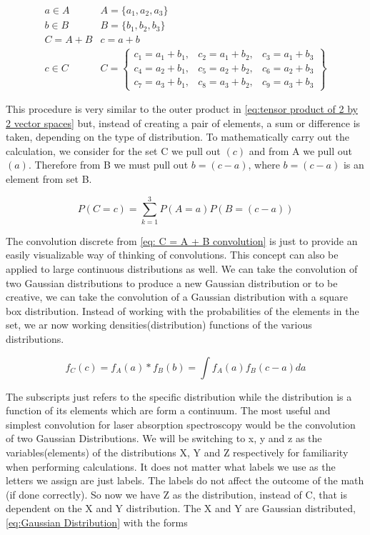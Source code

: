 \documentclass[11pt,a4paper]{book}
\begin{document}
		\begin{equation}
			\label{eq: C = A + B convolution}
			\begin{matrix}
			a \in A & A =\{a_1, a_2, a_3\} \\
			b \in B & B =\{b_1, b_2, b_3\} \\
			C = A + B & c = a + b \\
			c  \in C & C= 
				\begin{Bmatrix}
					c_1 = a_1 + b _1,& c_2 = a_1 + b_2, & c_3 = a_1 + b_3 \\
					c_4 = a_2 + b_1, & c_5 = a_2 + b_2, & c_6 = a_2 + b_3 \\
					c_7 = a_3 + b_1, & c_8 = a_3 + b_2, & c_9 = a_3 +b_ 3
				\end{Bmatrix}
			\end{matrix}
		\end{equation}
		
		This procedure is very similar to the outer product in \autoref{eq:tensor product of 2 by 2 vector spaces} but, instead of creating a pair of elements, a sum or difference is taken, depending on the type of distribution. To mathematically carry out the calculation, we consider for the set C we pull out $(c)$ and from A we pull out $(a)$. Therefore from B we must pull out $b = (c-a)$, where $b = (c-a)$ is an element from set B.
		
		\begin{equation}
			\label{eq:convolution set}
			P(C=c)=\sum_{k=1}^3{P(A=a)P
				\left(
					B=(c-a)
				\right)}
		\end{equation}
		
		The convolution discrete from \autoref{eq: C = A + B convolution} is just to provide an easily visualizable way of thinking of convolutions. This concept can also be applied to large continuous distributions as well. We can take the convolution of two Gaussian distributions to produce a new Gaussian distribution or to be creative, we can take the convolution of a Gaussian distribution with a square box distribution. Instead of working with the probabilities of the elements in the set, we ar now working densities(distribution) functions of the various distributions.
		
		\begin{equation}
			\label{eq:convolution distribution}
			f_C(c) = f_A(a) \ast f_B(b) = \int{f_A(a) f_B (c-a) da}
		\end{equation}
		
		The subscripts just refers to the specific distribution while the distribution is a function of its elements which are form a continuum. The most useful and simplest convolution for laser absorption spectroscopy would be the convolution of two Gaussian Distributions. We will be switching to x, y and z as the variables(elements) of the distributions X, Y and Z respectively for familiarity when performing calculations. It does not matter what labels we use as the letters we assign are just labels. The labels do not affect the outcome of the math (if done correctly). So now we have Z as the distribution, instead of C, that is dependent on the X and Y distribution. The X and Y are Gaussian distributed, \autoref{eq:Gaussian Distribution} with the forms
		
\end{document}
